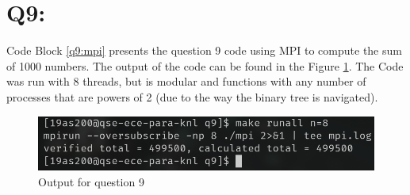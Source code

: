 \documentclass[11pt]{article}
\begin{document}
\clearpage

\section*{Q9:}

Code Block \ref{q9:mpi} presents the question 9 code using MPI to compute the sum of 1000 numbers.
The output of the code can be found in the Figure \ref{fig:q9}.
The Code was run with 8 threads, but is modular and functions with any number of processes that are powers of 2 (due to the way the binary tree is navigated).




\begin{figure}[H]
\centering
    \includegraphics[width=\textwidth]{./images/q9.png}
\caption{Output for question 9}
\label{fig:q9}
\end{figure}

\clearpage
\begin{appendices}\label{Appendix}
  
  
  
  
  

\end{appendices}
\end{document}
